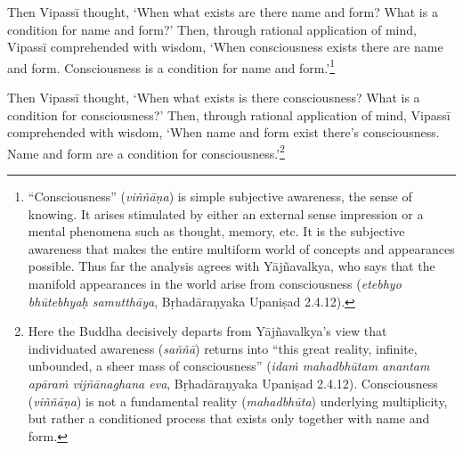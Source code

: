 \documentclass[12pt,openany]{book}%
\begin{document}
Then \textsanskrit{Vipassī} thought, ‘When what exists are there name and form? What is a condition for name and form?’ Then, through rational application of mind, \textsanskrit{Vipassī} comprehended with wisdom, ‘When consciousness exists there are name and form. Consciousness is a condition for name and form.’\footnote{“Consciousness” (\textit{\textsanskrit{viññāṇa}}) is simple subjective awareness, the sense of knowing. It arises stimulated by either an external sense impression or a mental phenomena such as thought, memory, etc. It is the subjective awareness that makes the entire multiform world of concepts and appearances possible. Thus far the analysis agrees with \textsanskrit{Yājñavalkya}, who says that the manifold appearances in the world arise from consciousness (\textit{etebhyo \textsanskrit{bhūtebhyaḥ} \textsanskrit{samutthāya}}, \textsanskrit{Bṛhadāraṇyaka} \textsanskrit{Upaniṣad} 2.4.12). } 

Then \textsanskrit{Vipassī} thought, ‘When what exists is there consciousness? What is a condition for consciousness?’ Then, through rational application of mind, \textsanskrit{Vipassī} comprehended with wisdom, ‘When name and form exist there’s consciousness. Name and form are a condition for consciousness.’\footnote{Here the Buddha decisively departs from \textsanskrit{Yājñavalkya}’s view that individuated awareness (\textit{\textsanskrit{saññā}}) returns into “this great reality, infinite, unbounded, a sheer mass of consciousness” (\textit{\textsanskrit{idaṁ} \textsanskrit{mahadbhūtam} anantam \textsanskrit{apāraṁ} \textsanskrit{vijñānaghana} eva}, \textsanskrit{Bṛhadāraṇyaka} \textsanskrit{Upaniṣad} 2.4.12). Consciousness (\textit{\textsanskrit{viññāṇa}}) is not a fundamental reality (\textit{\textsanskrit{mahadbhūta}}) underlying multiplicity, but rather a conditioned process that exists only together with name and form. } 
\end{document}
